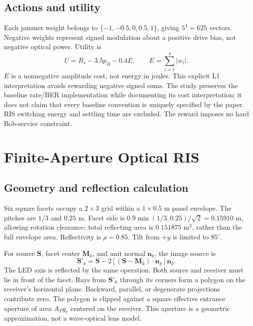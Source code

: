 \documentclass[journal,10pt,twocolumn]{IEEEtran}
\begin{document}
\subsection{Actions and utility}
Each jammer weight belongs to $\{-1,-0.5,0,0.5,1\}$, giving $5^4=625$ vectors. Negative weights represent signed modulation about a positive drive bias, not negative optical power. Utility is
\begin{equation}
U=R_s-3.5p_B-0.4E,\qquad E=\sum_{i=1}^{4}|w_i|.

\end{equation}
$E$ is a nonnegative amplitude cost, not energy in joules. This explicit L1 interpretation avoids rewarding negative signed sums. The study preserves the baseline rate/BER implementation while documenting its cost interpretation; it does not claim that every baseline convention is uniquely specified by the paper. RIS switching energy and settling time are excluded. The reward imposes no hard Bob-service constraint.

\section{Finite-Aperture Optical RIS}
\subsection{Geometry and reflection calculation}
Six square facets occupy a $2\times3$ grid within a $1\times0.5$ m panel envelope. The pitches are $1/3$ and $0.25$ m. Facet side is $0.9\min(1/3,0.25)/\sqrt2=0.15910$ m, allowing rotation clearance; total reflecting area is $0.151875$ m$^2$, rather than the full envelope area. Reflectivity is $\rho=0.85$. Tilt from $+y$ is limited to $85^\circ$.

For source $\mathbf{S}$, facet center $\mathbf{M}_k$, and unit normal $\mathbf{n}_k$, the image source is
\begin{equation}
\mathbf{S}'_k=\mathbf{S}-2[(\mathbf{S}-\mathbf{M}_k)\cdot\mathbf{n}_k]\mathbf{n}_k.
\end{equation}
The LED axis is reflected by the same operation. Both source and receiver must lie in front of the facet. Rays from $\mathbf{S}'_k$ through its corners form a polygon on the receiver's horizontal plane. Backward, parallel, or degenerate projections contribute zero. The polygon is clipped against a square effective entrance aperture of area $A_Pg_c$ centered on the receiver. This aperture is a geometric approximation, not a wave-optical lens model.
\end{document}
